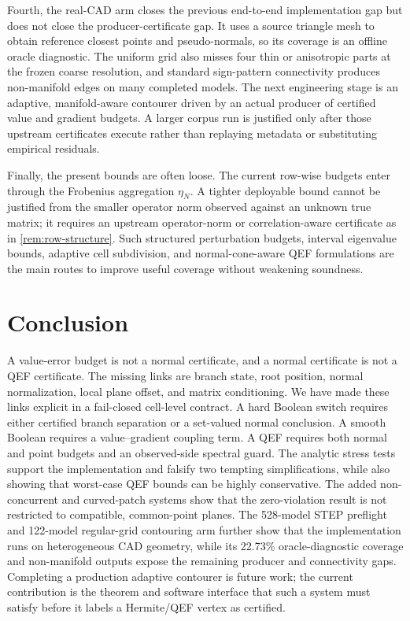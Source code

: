 \documentclass[11pt]{article}
\theoremstyle{definition}
\begin{document}
Fourth, the real-CAD arm closes the previous end-to-end implementation gap but
does not close the producer-certificate gap.  It uses a source triangle mesh
to obtain reference closest points and pseudo-normals, so its coverage is an
offline oracle diagnostic.  The uniform grid also misses four thin or
anisotropic parts at the frozen coarse resolution, and standard sign-pattern
connectivity produces non-manifold edges on many completed models.  The next
engineering stage is an adaptive, manifold-aware contourer driven by an actual
producer of certified value and gradient budgets.  A larger corpus run is
justified only after those upstream certificates execute rather than replaying
metadata or substituting empirical residuals.

Finally, the present bounds are often loose.  The current row-wise budgets
enter through the Frobenius aggregation \(\eta_N\).  A tighter deployable bound
cannot be justified from the smaller operator norm observed against an unknown
true matrix; it requires an upstream operator-norm or correlation-aware
certificate as in \cref{rem:row-structure}.  Such structured perturbation
budgets, interval eigenvalue bounds, adaptive cell subdivision, and
normal-cone-aware QEF formulations are the main routes to improve useful
coverage without weakening soundness.

\section{Conclusion}

A value-error budget is not a normal certificate, and a normal certificate is
not a QEF certificate.  The missing links are branch state, root position,
normal normalization, local plane offset, and matrix conditioning.  We have
made these links explicit in a fail-closed cell-level contract.  A hard Boolean
switch requires either certified branch separation or a set-valued normal
conclusion.  A smooth Boolean requires a value--gradient coupling term.  A QEF
requires both normal and point budgets and an observed-side spectral guard.
The analytic stress tests support the implementation and falsify two tempting
simplifications, while also showing that worst-case QEF bounds can be highly
conservative.  The added non-concurrent and curved-patch systems show that the
zero-violation result is not restricted to compatible, common-point planes.
The 528-model STEP preflight and 122-model regular-grid contouring arm further
show that the implementation runs on heterogeneous CAD geometry, while its
22.73\% oracle-diagnostic coverage and non-manifold outputs expose the remaining
producer and connectivity gaps.  Completing a production adaptive contourer is
future work; the current contribution is the theorem and software interface
that such a system must satisfy before it labels a Hermite/QEF vertex as
certified.
\end{document}
